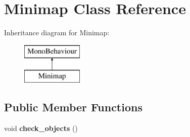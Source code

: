 \hypertarget{class_minimap}{}\section{Minimap Class Reference}
\label{class_minimap}
Inheritance diagram for Minimap\+:\begin{figure}[H]
\begin{center}
\leavevmode
\includegraphics[height=2.000000cm]{class_minimap}
\end{center}
\end{figure}
\subsection*{Public Member Functions}
\begin{DoxyCompactItemize}
\item 
\mbox{\label{class_minimap_a299c4a3912d915a76a0681592172c2af}} 
void {\bfseries check\+\_\+objects} ()
\end{DoxyCompactItemize}
